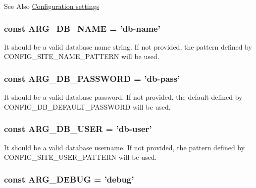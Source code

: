\begin{DoxySeeAlso}{See Also}
\hyperlink{group__config}{Configuration settings} 
\end{DoxySeeAlso}
\hypertarget{group__args_ga98d79ebbd1d09c1229a78e064d36e935}{
\subsubsection[{A\-R\-G\-\_\-\-D\-B\-\_\-\-N\-A\-M\-E}]{\setlength{\rightskip}{0pt plus 5cm}const A\-R\-G\-\_\-\-D\-B\-\_\-\-N\-A\-M\-E = 'db-\/name'}}\label{group__args_ga98d79ebbd1d09c1229a78e064d36e935}
It should be a valid database name string. If not provided, the pattern defined by C\-O\-N\-F\-I\-G\-\_\-\-S\-I\-T\-E\-\_\-\-N\-A\-M\-E\-\_\-\-P\-A\-T\-T\-E\-R\-N will be used. \hypertarget{group__args_ga3cb40cb5a16ad8799b2d00c1d799bac0}{
\subsubsection[{A\-R\-G\-\_\-\-D\-B\-\_\-\-P\-A\-S\-S\-W\-O\-R\-D}]{\setlength{\rightskip}{0pt plus 5cm}const A\-R\-G\-\_\-\-D\-B\-\_\-\-P\-A\-S\-S\-W\-O\-R\-D = 'db-\/pass'}}\label{group__args_ga3cb40cb5a16ad8799b2d00c1d799bac0}
It should be a valid database password. If not provided, the default defined by C\-O\-N\-F\-I\-G\-\_\-\-D\-B\-\_\-\-D\-E\-F\-A\-U\-L\-T\-\_\-\-P\-A\-S\-S\-W\-O\-R\-D will be used. \hypertarget{group__args_ga8a8e04a675209a2384eb4cc98004f1f2}{
\subsubsection[{A\-R\-G\-\_\-\-D\-B\-\_\-\-U\-S\-E\-R}]{\setlength{\rightskip}{0pt plus 5cm}const A\-R\-G\-\_\-\-D\-B\-\_\-\-U\-S\-E\-R = 'db-\/user'}}\label{group__args_ga8a8e04a675209a2384eb4cc98004f1f2}
It should be a valid database username. If not provided, the pattern defined by C\-O\-N\-F\-I\-G\-\_\-\-S\-I\-T\-E\-\_\-\-U\-S\-E\-R\-\_\-\-P\-A\-T\-T\-E\-R\-N will be used. \hypertarget{group__args_ga4c16b86b9d4656b8c7c6d27510566d77}{
\subsubsection[{A\-R\-G\-\_\-\-D\-E\-B\-U\-G}]{\setlength{\rightskip}{0pt plus 5cm}const A\-R\-G\-\_\-\-D\-E\-B\-U\-G = 'debug'}}\label{group__args_ga4c16b86b9d4656b8c7c6d27510566d77}
